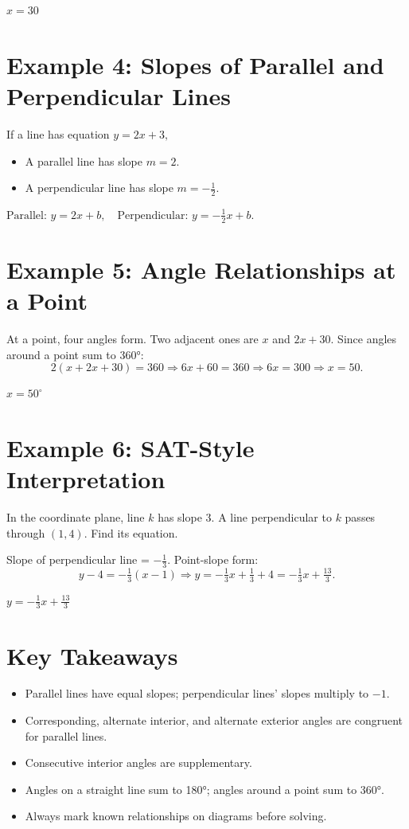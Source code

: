 \documentclass[14pt]{extarticle}
\begin{document}
\(\boxed{x = 30}\)

\section*{Example 4: Slopes of Parallel and Perpendicular Lines}

If a line has equation \(y = 2x + 3,\)
\begin{itemize}
  \item A parallel line has slope \(m = 2.\)
  \item A perpendicular line has slope \(m = -\frac{1}{2}.\)
\end{itemize}

\(\boxed{\text{Parallel: } y = 2x + b, \quad \text{Perpendicular: } y = -\tfrac{1}{2}x + b.}\)

\section*{Example 5: Angle Relationships at a Point}

At a point, four angles form. Two adjacent ones are \(x\) and \(2x + 30.\)  
Since angles around a point sum to 360°:
\[
2(x + 2x + 30) = 360 \Rightarrow 6x + 60 = 360 \Rightarrow 6x = 300 \Rightarrow x = 50.
\]

\(\boxed{x = 50^\circ}\)

\section*{Example 6: SAT-Style Interpretation}

In the coordinate plane, line \(k\) has slope \(3.\)  
A line perpendicular to \(k\) passes through \((1, 4)\).  
Find its equation.

Slope of perpendicular line = \(-\frac{1}{3}\).  
Point-slope form:
\[
y - 4 = -\tfrac{1}{3}(x - 1) \Rightarrow y = -\tfrac{1}{3}x + \tfrac{1}{3} + 4 = -\tfrac{1}{3}x + \tfrac{13}{3}.
\]

\(\boxed{y = -\tfrac{1}{3}x + \tfrac{13}{3}}\)

\section*{Key Takeaways}
\begin{itemize}
  \item Parallel lines have equal slopes; perpendicular lines’ slopes multiply to \(-1.\)
  \item Corresponding, alternate interior, and alternate exterior angles are congruent for parallel lines.
  \item Consecutive interior angles are supplementary.
  \item Angles on a straight line sum to 180°; angles around a point sum to 360°.
  \item Always mark known relationships on diagrams before solving.
\end{itemize}
\end{document}

